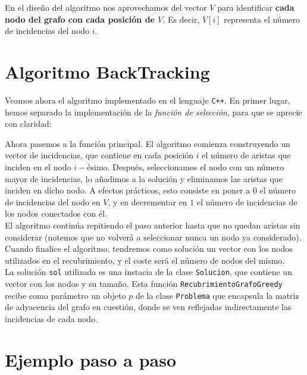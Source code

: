 \documentclass[11pt]{article}
\begin{document}
En el diseño del algoritmo nos aprovechamos del vector $V$ para identificar \textbf{cada nodo del grafo con cada posición de $V$}. Es decir, $V[i]$ representa el número de incidencias del nodo $i$.

\section*{Algoritmo BackTracking}

Veamos ahora el algoritmo implementado en el lenguaje \verb|C++|. En primer lugar, hemos separado la implementación de la \textit{función de selección}, para que se aprecie con claridad:

\vspace{1em}

Ahora pasemos a la función principal. El algoritmo comienza construyendo un vector de incidencias, que contiene en cada posición $i$ el número de aristas que inciden en el nodo $i-$ésimo. Después, seleccionamos el nodo con un número mayor de incidencias, lo añadimos a la solución y eliminamos las aristas que inciden en dicho nodo. A efectos prácticos, esto consiste en poner a $0$ el número de incidencias del nodo en $V$, y en decrementar en $1$ el número de incidencias de los nodos conectados con él.\\


El algoritmo continúa repitiendo el paso anterior hasta que no quedan aristas sin considerar (notemos que no volverá a seleccionar nunca un nodo ya considerado). Cuando finalice el algoritmo, tendremos como solución un vector con los nodos utilizados en el recubrimiento, y el coste será el número de nodos del mismo.\\

%

La solución \verb|sol| utilizada es una instacia de la clase \verb|Solucion|, que contiene un vector con los nodos y su tamaño. Esta función \verb|RecubrimientoGrafoGreedy| recibe como parámetro un objeto $p$ de la clase \verb|Problema| que encapsula la matriz de adyacencia del grafo en cuestión, donde se ven reflejadas indirectamente las incidencias de cada nodo.


\section*{Ejemplo paso a paso}
\end{document}
